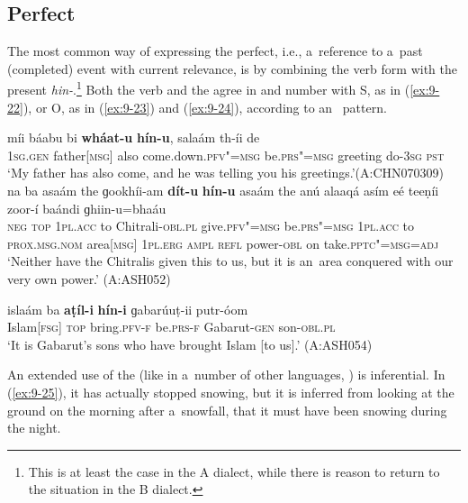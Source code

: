 \subsection{Perfect}
\label{subsec:9-1-7}

The most common way of expressing the perfect, i.e., a~reference to a~past (completed) event with current relevance, is by combining the  verb form with the present   \textit{hin-}.\footnote{This is at least the case in the A dialect, while there is reason to return to the situation in the B dialect.} Both the  verb and the  agree in  and number with S, as in (\ref{ex:9-22}), or O, as in (\ref{ex:9-23}) and (\ref{ex:9-24}), according to an~ pattern.

\ea
\label{ex:9-22}
\gll míi báabu bi \textbf{wháat-u} \textbf{hín-u}, salaám th-íi de\\
\textsc{1sg.gen} father\textsc{[msg]} also come.down.\textsc{pfv"=msg} be.\textsc{prs"=msg} greeting do-\textsc{3sg} \textsc{pst} \\
\glt `My father has also come, and he was telling you his greetings.'\newline (A:CHN070309)
\ex
\label{ex:9-23}
\gll na ba asaám the ɡookhíi-am \textbf{dít-u} \textbf{hín-u} asaám the anú alaaqá asím eé teeṇíi zoor-í baándi ɡhiin-u=bhaáu\\
\textsc{neg} \textsc{top} \textsc{1pl.acc} to Chitrali-\textsc{obl.pl} give.\textsc{pfv"=msg}  be.\textsc{prs"=msg } \textsc{1pl.acc} to \textsc{prox.msg.nom} area\textsc{[msg]} \textsc{1pl.erg} \textsc{ampl} \textsc{refl} power-\textsc{obl} on take.\textsc{pptc"=msg=adj}\\
\glt `Neither have the Chitralis given this to us, but it is an~area conquered with our very own power.' (A:ASH052)

\ex
\label{ex:9-24}
\gll islaám ba \textbf{aṭíl-i} \textbf{hín-i} ɡabarúuṭ-ii putr-óom \\
Islam\textsc{[fsg]} \textsc{top} bring.\textsc{pfv-f} be.\textsc{prs-f} Gabarut-\textsc{gen} son-\textsc{obl.pl} \\
\glt `It is Gabarut's sons who have brought Islam [to us].' (A:ASH054) 
\z

An extended use of the  (like in a~number of other languages, \citealt[152]{dahl1985}) is inferential. In (\ref{ex:9-25}), it has actually stopped snowing, but it is inferred from looking at the ground on the morning after a~snowfall, that it must have been snowing during the night.

